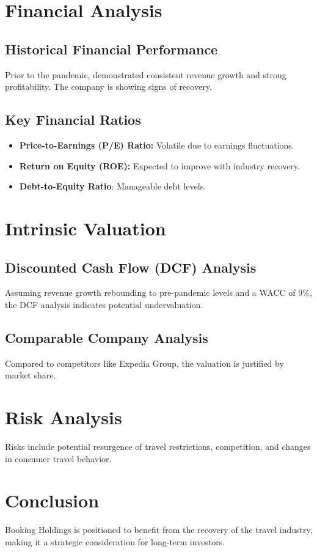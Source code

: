 \documentclass[12pt]{report}
\begin{document}
\section{Financial Analysis}
\subsection{Historical Financial Performance}
Prior to the pandemic, demonstrated consistent revenue growth and strong profitability. The company is showing signs of recovery.

\subsection{Key Financial Ratios}
\begin{itemize}
    \item \textbf{Price-to-Earnings (P/E) Ratio:} Volatile due to earnings fluctuations.
    \item \textbf{Return on Equity (ROE):} Expected to improve with industry recovery.
    \item \textbf{Debt-to-Equity Ratio}: Manageable debt levels.
\end{itemize}

\section{Intrinsic Valuation}
\subsection{Discounted Cash Flow (DCF) Analysis}
Assuming revenue growth rebounding to pre-pandemic levels and a WACC of 9\%, the DCF analysis indicates potential undervaluation.

\subsection{Comparable Company Analysis}
Compared to competitors like Expedia Group, the valuation is justified by market share.

\section{Risk Analysis}
Risks include potential resurgence of travel restrictions, competition, and changes in consumer travel behavior.

\section{Conclusion}
Booking Holdings is positioned to benefit from the recovery of the travel industry, making it a strategic consideration for long-term investors.
\end{document}
